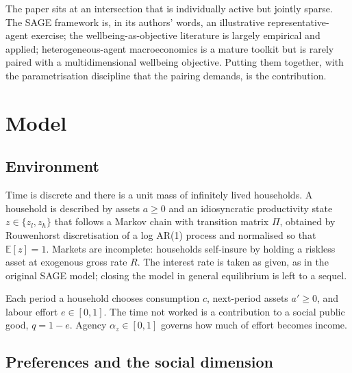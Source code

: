 \documentclass[11pt]{article}
\begin{document}
The paper sits at an intersection that is individually active but jointly sparse. The SAGE framework is, in its authors' words, an illustrative representative-agent exercise; the wellbeing-as-objective literature is largely empirical and applied; heterogeneous-agent macroeconomics is a mature toolkit \citep{kaplan2018} but is rarely paired with a multidimensional wellbeing objective. Putting them together, with the parametrisation discipline that the pairing demands, is the contribution.

\section{Model}

\subsection{Environment}

Time is discrete and there is a unit mass of infinitely lived households. A household is described by assets $a \ge 0$ and an idiosyncratic productivity state $z \in \{z_l, z_h\}$ that follows a Markov chain with transition matrix $\Pi$, obtained by Rouwenhorst discretisation \citep{rouwenhorst1995} of a log AR(1) process and normalised so that $\mathbb{E}[z]=1$. Markets are incomplete: households self-insure by holding a riskless asset at exogenous gross rate $R$. The interest rate is taken as given, as in the original SAGE model; closing the model in general equilibrium is left to a sequel.

Each period a household chooses consumption $c$, next-period assets $a' \ge 0$, and labour effort $e \in [0,1]$. The time not worked is a contribution to a social public good, $q = 1-e$. Agency $\alpha_z \in [0,1]$ governs how much of effort becomes income.

\subsection{Preferences and the social dimension}
\end{document}

